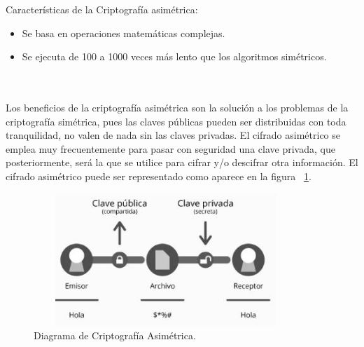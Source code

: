 \bigskip Características de la Criptografía asimétrica: \begin{itemize}
	\item Se basa en operaciones matemáticas complejas.
	\item Se ejecuta de 100 a 1000 veces más lento que los algoritmos simétricos.
\end{itemize} ~\cite{sime} \\ \\ 

 Los beneficios de la criptografía asimétrica son la solución a los problemas de la criptografía simétrica, pues las claves públicas pueden ser distribuidas con toda tranquilidad, no valen de nada sin las claves privadas. El cifrado asimétrico se emplea muy frecuentemente para pasar con seguridad una clave privada, que posteriormente, será la que se utilice para cifrar y/o descifrar otra información. El cifrado asimétrico puede ser representado como aparece en la figura ~\ref{fig:1-2-4}.

\begin{figure}[H]
\centering
	\includegraphics[width=10cm, height=5cm]{./images/Cripto_Asimetrica.jpg}
	\caption{Diagrama de Criptografía Asimétrica.}
	\label{fig:1-2-4}
\end{figure}

